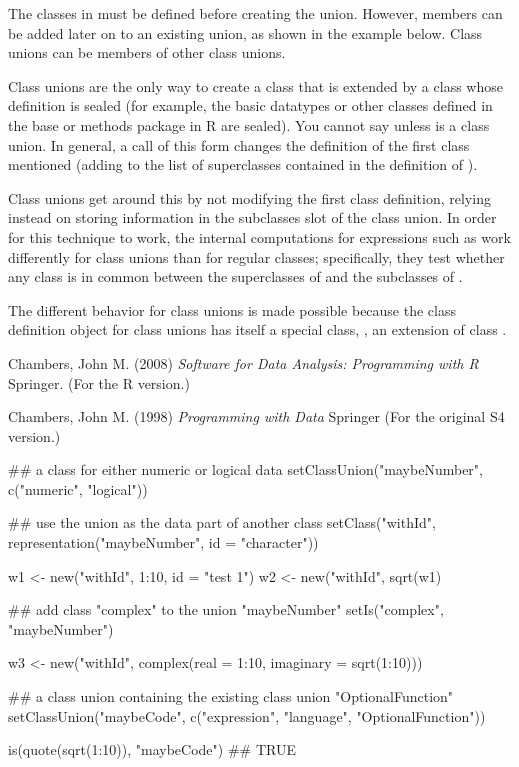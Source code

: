\begin{Details}\relax
The classes in  must be defined before creating the
union.  However, members can be added later on to an existing
union, as shown in the example below. Class unions can be
members of other class unions.

Class unions are the only way to create a class that is extended by
a class whose definition is sealed (for example, the
basic datatypes or other classes defined in the base or methods
package in R are sealed).  You cannot say 
unless  is a class union.  In general, a
 call of this form changes the definition of the
first class mentioned (adding  to the list of
superclasses contained in the definition of ).

Class unions get around this by not modifying the first class
definition, relying instead on storing information in the subclasses
slot of the class union.  In order for this technique to work, the
internal computations for expressions such as
 work
differently for class unions than for regular classes; specifically,
they test whether any class is in common between the superclasses of
 and the subclasses of .

The different behavior for class unions is made possible because the
class definition object for class unions has itself a special class,
, an extension of class
.

\end{Details}
%
\begin{References}\relax
Chambers, John M. (2008)
\emph{Software for Data Analysis: Programming with R}
Springer.  (For the R version.)

Chambers, John M. (1998)
\emph{Programming with Data}
Springer (For the original S4 version.)
\end{References}
%
\begin{Examples}
\begin{ExampleCode}
## a class for either numeric or logical data
setClassUnion("maybeNumber", c("numeric", "logical"))

## use the union as the data part of another class
setClass("withId", representation("maybeNumber", id = "character"))

w1 <- new("withId", 1:10, id = "test 1")
w2 <- new("withId", sqrt(w1)%

## add class "complex" to the union "maybeNumber"
setIs("complex", "maybeNumber")

w3 <- new("withId", complex(real = 1:10, imaginary = sqrt(1:10)))

## a class union containing the existing class  union "OptionalFunction"
setClassUnion("maybeCode",
    c("expression", "language", "OptionalFunction"))

is(quote(sqrt(1:10)), "maybeCode")  ## TRUE


\end{ExampleCode}
\end{Examples}
